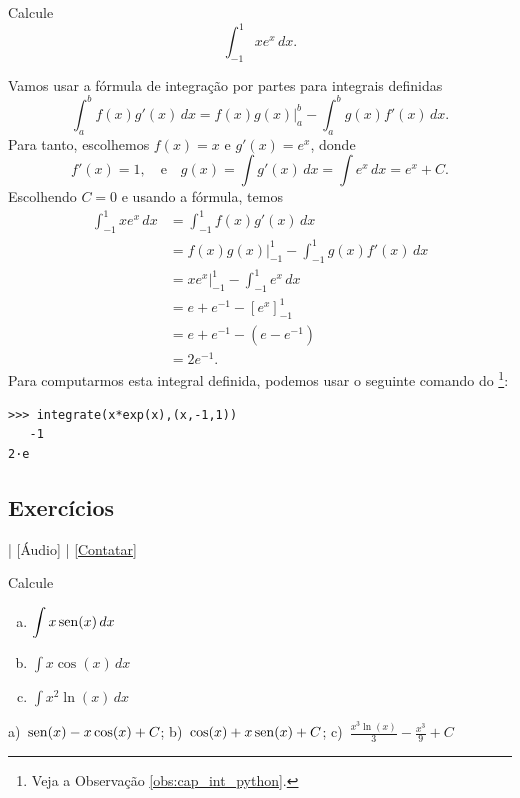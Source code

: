 \begin{exeresol}
  Calcule
  \begin{equation}
    \int_{-1}^1 xe^x\,dx.
  \end{equation}
\end{exeresol}
\begin{resol}
  Vamos usar a fórmula de integração por partes para integrais definidas
  \begin{equation}
    \int_a^b f(x)g'(x)\,dx = f(x)g(x)|_{a}^b - \int_a^b g(x)f'(x)\,dx.
  \end{equation}
  Para tanto, escolhemos $f(x) = x$ e $g'(x) = e^x$, donde
  \begin{equation}
    f'(x) = 1,\quad\text{e}\quad g(x) = \int g'(x)\,dx = \int e^x\,dx = e^x + C.
  \end{equation}
  Escolhendo $C=0$ e usando a fórmula, temos
  \begin{align}
    \int_{-1}^1 xe^x\,dx &= \int_{-1}^1 f(x)g'(x)\,dx\\
                         &= f(x)g(x)|_{-1}^1 - \int_{-1}^1 g(x)f'(x)\,dx\\
                         &= xe^x|_{-1}^1 - \int_{-1}^1 e^x\,dx\\
                         &= e+e^{-1}-[e^x]_{-1}^1\\
                         &= e+e^{-1}-(e-e^{-1})\\
                         &= 2e^{-1}.
  \end{align}
  \ifispython
  Para computarmos esta integral definida, podemos usar o seguinte comando do \sympy\footnote{Veja a Observação \ref{obs:cap_int_python}.}:
\begin{verbatim}
>>> integrate(x*exp(x),(x,-1,1))
   -1
2·e
\end{verbatim}
  \fi
\end{resol}

\subsection*{Exercícios}

\begin{flushright}
  [Vídeo] | [Áudio] | \href{https://phkonzen.github.io/notas/contato.html}{[Contatar]}
\end{flushright}

\begin{exer}
  Calcule
  \begin{enumerate}[a)]
  \item $\displaystyle \int x\operatorname{sen}(x)\,dx$
  \item $\displaystyle \int x\cos(x)\,dx$
  \item $\displaystyle \int x^2\ln(x)\,dx$
  \end{enumerate}
\end{exer}
\begin{resp}
  a)~$\displaystyle \operatorname{sen}(x)-x\cos(x)+C$; b)~$\displaystyle \cos(x)+x\operatorname{sen}(x)+C$;  c)~$\displaystyle \frac{x^3\ln(x)}{3} - \frac{x^3}{9} + C$
\end{resp}

